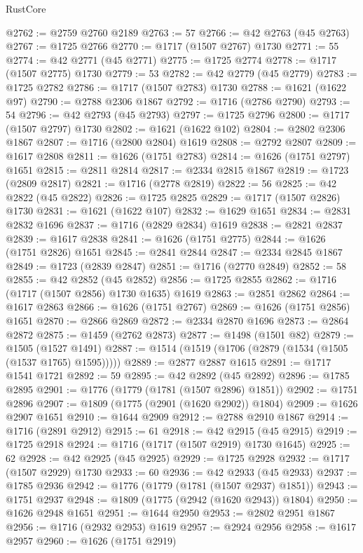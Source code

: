 \begin{lexlean}{RustCore}
\begin{coremodule}
@2762 := @2759 @2760 @2189
@2763 := 57
@2766 := @42 @2763 (@45 @2763)
@2767 := @1725 @2766
@2770 := @1717 (@1507 @2767) @1730
@2771 := 55
@2774 := @42 @2771 (@45 @2771)
@2775 := @1725 @2774
@2778 := @1717 (@1507 @2775) @1730
@2779 := 53
@2782 := @42 @2779 (@45 @2779)
@2783 := @1725 @2782
@2786 := @1717 (@1507 @2783) @1730
@2788 := @1621 (@1622 @97)
@2790 := @2788 @2306 @1867
@2792 := @1716 (@2786 @2790)
@2793 := 54
@2796 := @42 @2793 (@45 @2793)
@2797 := @1725 @2796
@2800 := @1717 (@1507 @2797) @1730
@2802 := @1621 (@1622 @102)
@2804 := @2802 @2306 @1867
@2807 := @1716 (@2800 @2804) @1619
@2808 := @2792 @2807
@2809 := @1617 @2808
@2811 := @1626 (@1751 @2783)
@2814 := @1626 (@1751 @2797) @1651
@2815 := @2811 @2814
@2817 := @2334 @2815 @1867
@2819 := @1723 (@2809 @2817)
@2821 := @1716 (@2778 @2819)
@2822 := 56
@2825 := @42 @2822 (@45 @2822)
@2826 := @1725 @2825
@2829 := @1717 (@1507 @2826) @1730
@2831 := @1621 (@1622 @107)
@2832 := @1629 @1651
@2834 := @2831 @2832 @1696
@2837 := @1716 (@2829 @2834) @1619
@2838 := @2821 @2837
@2839 := @1617 @2838
@2841 := @1626 (@1751 @2775)
@2844 := @1626 (@1751 @2826) @1651
@2845 := @2841 @2844
@2847 := @2334 @2845 @1867
@2849 := @1723 (@2839 @2847)
@2851 := @1716 (@2770 @2849)
@2852 := 58
@2855 := @42 @2852 (@45 @2852)
@2856 := @1725 @2855
@2862 := @1716 (@1717 (@1507 @2856) @1730 @1635) @1619
@2863 := @2851 @2862
@2864 := @1617 @2863
@2866 := @1626 (@1751 @2767)
@2869 := @1626 (@1751 @2856) @1651
@2870 := @2866 @2869
@2872 := @2334 @2870 @1696
@2873 := @2864 @2872
@2875 := @1459 (@2762 @2873)
@2877 := @1498 (@1501 @82)
@2879 := @1505 (@1527 @1491)
@2887 := @1514 (@1519 (@1706 (@2879 (@1534 (@1505 (@1537 @1765) @1595)))))
@2889 := @2877 @2887 @1615
@2891 := @1717 @1541 @1721
@2892 := 59
@2895 := @42 @2892 (@45 @2892)
@2896 := @1785 @2895
@2901 := @1776 (@1779 (@1781 (@1507 @2896) @1851))
@2902 := @1751 @2896
@2907 := @1809 (@1775 (@2901 (@1620 @2902)) @1804)
@2909 := @1626 @2907 @1651
@2910 := @1644 @2909
@2912 := @2788 @2910 @1867
@2914 := @1716 (@2891 @2912)
@2915 := 61
@2918 := @42 @2915 (@45 @2915)
@2919 := @1725 @2918
@2924 := @1716 (@1717 (@1507 @2919) @1730 @1645)
@2925 := 62
@2928 := @42 @2925 (@45 @2925)
@2929 := @1725 @2928
@2932 := @1717 (@1507 @2929) @1730
@2933 := 60
@2936 := @42 @2933 (@45 @2933)
@2937 := @1785 @2936
@2942 := @1776 (@1779 (@1781 (@1507 @2937) @1851))
@2943 := @1751 @2937
@2948 := @1809 (@1775 (@2942 (@1620 @2943)) @1804)
@2950 := @1626 @2948 @1651
@2951 := @1644 @2950
@2953 := @2802 @2951 @1867
@2956 := @1716 (@2932 @2953) @1619
@2957 := @2924 @2956
@2958 := @1617 @2957
@2960 := @1626 (@1751 @2919)

\end{coremodule}
\end{lexlean}
